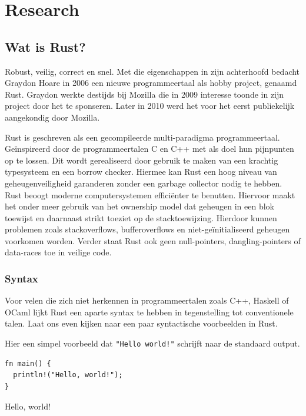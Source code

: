 \chapter{Research}
\label{research}

\section{Wat is Rust?}

Robust, veilig, correct en snel. Met die eigenschappen in zijn achterhoofd bedacht Graydon Hoare in
2006 een nieuwe programmeertaal als hobby project, genaamd Rust. Graydon werkte destijds bij Mozilla
die in 2009 interesse toonde in zijn project door het te sponseren. Later in 2010 werd het voor het
eerst publiekelijk aangekondig door Mozilla.

Rust is geschreven als een gecompileerde multi-paradigma programmeertaal. Geïnspireerd door de
programmeertalen C en C++ met als doel hun pijnpunten op te lossen. Dit wordt gerealiseerd door
gebruik te maken van een krachtig typesysteem en een borrow checker. Hiermee kan Rust een hoog
niveau van geheugenveiligheid garanderen zonder een garbage collector nodig te hebben. Rust beoogt
moderne computersystemen efficiënter te benutten. Hiervoor maakt het onder meer gebruik van het
ownership model dat geheugen in een blok toewijst en daarnaast strikt toeziet op de stacktoewijzing.
Hierdoor kunnen problemen zoals stackoverflows, bufferoverflows en niet-geïnitialiseerd geheugen
voorkomen worden. Verder staat Rust ook geen null-pointers, dangling-pointers of data-races toe in
veilige code.

\subsection{Syntax} 

Voor velen die zich niet herkennen in programmeertalen zoals C++, Haskell of OCaml lijkt Rust een
aparte syntax te hebben in tegenstelling tot conventionele talen. Laat ons even kijken naar een paar
syntactische voorbeelden in Rust.

Hier een simpel voorbeeld dat \texttt{"Hello world!"} schrijft naar de standaard output.

\begin{listing}[h]
\begin{verbatim}
fn main() {
  println!("Hello, world!");
}
\end{verbatim}
\caption{Hello, world!}
\end{listing}

